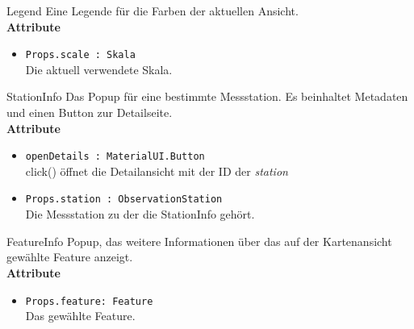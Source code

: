     \begin{Class}{Legend}
        Eine Legende für die Farben der aktuellen Ansicht.
        \bigskip\\
        \textbf{Attribute}
        \begin{itemize}
            \item \texttt{Props.scale : Skala}
            \\ Die aktuell verwendete Skala.
        \end{itemize}
    \end{Class}
    
    \begin{Class}{StationInfo}
        Das Popup für eine bestimmte Messstation. Es beinhaltet Metadaten und einen Button zur Detailseite.
        \bigskip\\
        \textbf{Attribute}
        \begin{itemize}
            \item \texttt{openDetails : MaterialUI.Button}
            \\ click() öffnet die Detailansicht mit der ID der \emph{station}
            \item \texttt{Props.station : ObservationStation}
            \\ Die Messstation zu der die StationInfo gehört.
        \end{itemize}
    \end{Class}

    \begin{Class}{FeatureInfo}
        Popup, das weitere Informationen über das auf der \gls{Kartenansicht} gewählte Feature anzeigt.
        \bigskip\\
        \textbf{Attribute}
        \begin{itemize}
            \item \texttt{Props.feature: Feature}
            \\Das gewählte Feature.
        \end{itemize}
    \end{Class}

